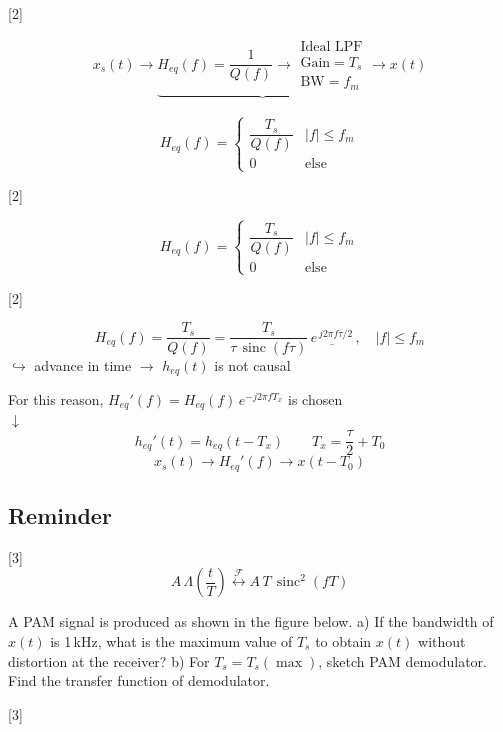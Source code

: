 \documentclass[11pt,a4paper]{article}
\begin{document}
[2]

\[ x_s(t) \longrightarrow \underbrace{\boxed{H_{eq}(f)=\frac{1}{Q(f)}} \longrightarrow \boxed{\begin{matrix}\text{Ideal LPF}\\ \text{Gain}=T_s\\ \text{BW}=f_m\end{matrix}}}_{} \longrightarrow x(t) \]

\[ H_{eq}(f) = \begin{cases} \dfrac{T_s}{Q(f)} & |f|\le f_m\\[1ex] 0 & \text{else} \end{cases} \]

[2]

\[ H_{eq}(f) = \begin{cases} \dfrac{T_s}{Q(f)} & |f|\le f_m\\[1ex] 0 & \text{else} \end{cases} \]

[2]

\[ H_{eq}(f) = \frac{T_s}{Q(f)} = \frac{T_s}{\tau\,\operatorname{sinc}(f\tau)}\,\underline{e^{\,j2\pi f \tau/2}}\,,\quad |f|\le f_m \]
\hspace*{3em}$\hookrightarrow$ advance in time $\rightarrow$ $h_{eq}(t)$ is not causal

For this reason, $H_{eq}'(f) = H_{eq}(f)\, e^{-j2\pi f T_x}$ is chosen\\
$\downarrow$
\[ h_{eq}'(t) = h_{eq}(t-T_x) \qquad T_x = \frac{\tau}{2}+T_0 \]
\[ x_s(t) \longrightarrow \boxed{H_{eq}'(f)} \longrightarrow x(t-T_0) \]

\subsection{Reminder}
[3]
\[ A\,\Lambda\!\left(\frac{t}{T}\right) \overset{\mathcal{F}}{\longleftrightarrow} A\,T\,\operatorname{sinc}^2(fT) \]

\begin{ornek}[(2004 Midterm Ex.Q.)]
A PAM signal is produced as shown in the figure below. a) If the bandwidth of $x(t)$ is 1\,kHz, what is the maximum value of $T_s$ to obtain $x(t)$ without distortion at the receiver? b) For $T_s=T_s(\max)$, sketch PAM demodulator. Find the transfer function of demodulator.

[3]
\end{ornek}
\end{document}
